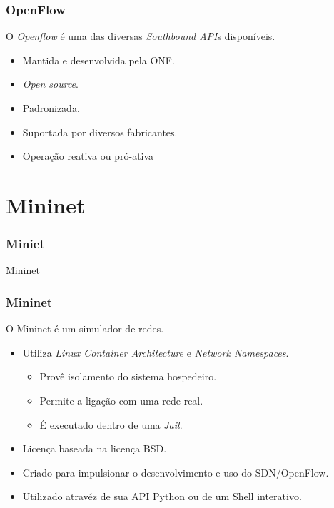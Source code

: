 \documentclass{beamer}
\begin{document}
\begin{frame}
    \frametitle{OpenFlow}

    O \textit{Openflow} é uma das diversas \textit{Southbound API}s disponíveis.

    \begin{itemize}
        \item Mantida e desenvolvida pela ONF.
        \item \textit{Open source}.
        \item Padronizada.
        \item Suportada por diversos fabricantes.
        \item Operação reativa ou pró-ativa
    \end{itemize}
\end{frame}

\section{Mininet}

\begin{frame}
    \frametitle{Miniet}

    \begin{center}
        {\huge Mininet}
    \end{center}

\end{frame}

\begin{frame}
    \frametitle{Mininet}

    O Mininet é um simulador de redes.

    \begin{itemize}
        \item Utiliza \textit{Linux Container Architecture} e \textit{Network Namespaces}.
        \begin{itemize}
            \item Provê isolamento do sistema hospedeiro.
            \item Permite a ligação com uma rede real.
            \item É executado dentro de uma \textit{Jail}.
        \end{itemize}
        \item Licença baseada na licença BSD.
        \item Criado para impulsionar o desenvolvimento e uso do SDN/OpenFlow.
        \item Utilizado atravéz de sua API Python ou de um Shell interativo.
    \end{itemize}
\end{frame}
\end{document}
